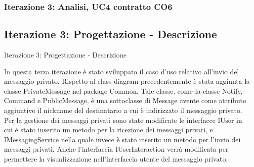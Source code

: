 \begin{frame}
 \frametitle{Iterazione 3: Analisi, UC4 contratto CO6 }
  \begin{table}[!htbp]
   \caption {UC3 Contratto CO6 - privateMsg}
    \label{table_CO6}
   \end{table}
\end{frame}

\subsection{Iterazione 3: Progettazione - Descrizione}
\begin{frame} {Iterazione 3: Progettazione - Descrizione}
  \begin{scriptsize}
    In questa terza iterazione è stato sviluppato il caso d'uso relativo all'invio del messaggio privato. Rispetto al class diagram precedentemente è stata aggiunta 
    la classe PrivateMessage nel package Common. Tale classe, come la classe Notify, Command e PublicMessage, è una sottoclasse di Message avente come attributo 
    aggiuntivo il nickname del destinatario a cui è indirizzato il messaggio privato.
    \newline
    Per la gestione dei messaggi privati sono state modificate le interfacce IUser in cui è stato inserito un metodo per la ricezione dei messaggi privati, e   
    IMessagingService nella quale invece è stato inserito un metodo per l'invio dei messaggi privati. Anche l'interfaccia IUserInteraction verrà modificata per 
    permettere la visualizzazione nell'interfaccia utente del messaggio privato.
  \end{scriptsize}
\end{frame}


